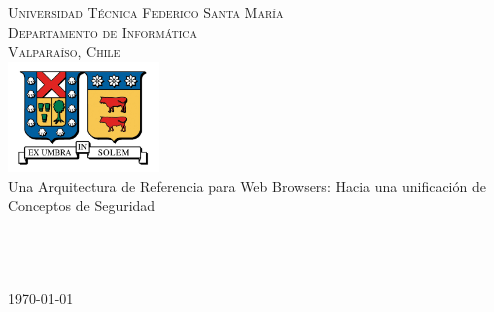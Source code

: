 \begin{titlepage}

\begin{center}

\textsc{\Large Universidad Técnica Federico Santa María}\\
\textsc{\large Departamento de Informática}\\
\textsc{\large Valparaíso, Chile}\\[1.5cm]

\includegraphics[width=0.3\textwidth]{figures/utfsm.jpg}\\[1cm]    

{ \huge Una Arquitectura de Referencia para Web Browsers: Hacia una unificación de Conceptos de Seguridad }\\[2cm]

\\[2cm]
\\[3cm]
\\

\vfill

{\large \today}

\end{center}

\end{titlepage}
